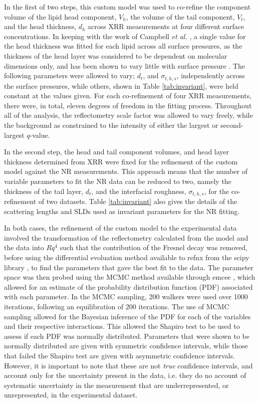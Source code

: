 \documentclass[amsmath,amssymb,twocolumn,superscriptaddress]{revtex4-1}
\begin{document}
In the first of two steps, this custom model was used to co-refine the component volume of the lipid head component, $V_h$, the volume of the tail component, $V_t$, and the head thickness, $d_h$ across XRR measurements at four different surface concentrations.
In keeping with the work of Campbell \emph{et al.} \cite{Campbell2018}, a single value for the head thickness was fitted for each lipid across all surface pressures, as the thickness of the head layer was considered to be dependent on molecular dimensions only, and has been shown to vary little with surface pressure \cite{Kewalramani2010}.
The following parameters were allowed to vary; $d_t$, and $\sigma_{t,h,s}$, independently across the surface pressures, while others, shown in Table \ref{tab:invariant}, were held constant at the values given.
For each co-refinement of four XRR measurements, there were, in total, eleven degrees of freedom in the fitting process.
Throughout all of the analysis, the reflectometry scale factor was allowed to vary freely, while the background as constrained to the intensity of either the largest or second-largest $q$-value.

In the second step, the head and tail component volumes, and head layer thickness determined from XRR were fixed for the refinement of the custom model against the NR measurements.
This approach means that the number of variable parameters to fit the NR data can be reduced to two, namely the thickness of the tail layer, $d_t$, and the interfacial roughness, $\sigma_{t,h,s}$, for the co-refinement of two datasets.
Table \ref{tab:invariant} also gives the details of the scattering lengths and SLDs used as invariant parameters for the NR fitting.

In both cases, the refinement of the custom model to the experimental data involved the transformation of the reflectometry calculated from the model and the data into $Rq^4$ such that the contribution of the Fresnel decay was removed, before using the differential evoluation method available to refnx from the scipy library \cite{Jones2001}, to find the parameters that gave the best fit to the data.
The parameter space was then probed using the MCMC method available through emcee \cite{Foreman-Mackey2013}, which allowed for an estimate of the probability distribution function (PDF) associated with each parameter.
In the MCMC sampling, 200 walkers were used over 1000 iterations, following an equilibration of 200 iterations.
The use of MCMC sampling allowed for the Bayesian inference of the PDF for each of the variables and their respective interactions.
This allowed the Shapiro test to be used to assess if each PDF was normally distributed.
Parameters that were shown to be normally distributed are given with symmetric confidence intervals, while those that failed the Shapiro test are given with asymmetric confidence intervals.
However, it is important to note that these are not \emph{true} confidence intervals, and account only for the uncertainty present in the data, i.e. they do no account of systematic uncertainty in the measurement that are underrepresented, or unrepresented, in the experimental dataset.
\end{document}
